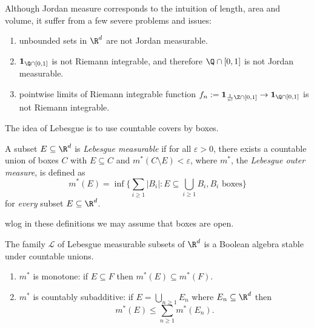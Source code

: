 \documentclass[a4paper]{article}
\begin{document}
Although Jordan measure corresponds to the intuition of length, area and volume, it suffer from a few severe problems and issues:
\begin{enumerate}
\item unbounded sets in \(\R^d\) are not Jordan measurable.
\item \(\mathbf 1_{\Q \cap [0, 1]}\) is not Riemann integrable, and therefore \(\Q \cap [0, 1]\) is not Jordan measurable.
\item pointwise limits of Riemann integrable function \(f_n := \mathbf 1_{\frac{1}{n!} \Z \cap [0, 1]} \to \mathbf 1_{\Q \cap [0, 1]}\) is not Riemann integrable.
\end{enumerate}

The idea of Lebesgue is to use countable covers by boxes.

\begin{definition}
  A subset \(E \subseteq \R^d\) is \emph{Lebesgue measurable} if for all \(\varepsilon > 0\), there exists a countable union of boxes \(C\) with \(E \subseteq C\) and \(m^*(C \setminus E) < \varepsilon\), where \(m^*\), the \emph{Lebesgue outer measure}, is defined as
  \[
    m^*(E) = \inf \{\sum_{i \geq 1} |B_i|: E \subseteq \bigcup_{i \geq 1} B_i, B_i \text{ boxes}\}
  \]
  for \emph{every} subset \(E \subseteq \R^d\).
\end{definition}

\begin{remark}
  wlog in these definitions we may assume that boxes are open.
\end{remark}


\begin{proposition}
  \label{prop:Lebesgue measurable subset is Boolean algebra}
  The family \(\mathcal L\) of Lebesgue measurable subsets of \(\R^d\) is a Boolean algebra stable under countable unions.
\end{proposition}

\begin{lemma}\leavevmode
  \begin{enumerate}
  \item \(m^*\) is monotone: if \(E \subseteq F\) then \(m^*(E) \subseteq m^*(F)\).
  \item \(m^*\) is countably subadditive: if \(E = \bigcup_{n \geq 1} E_n\) where \(E_n \subseteq \R^d\) then
    \[
      m^*(E) \leq \sum_{n \geq 1} m^*(E_n).
    \]
  \end{enumerate}
\end{lemma}
\end{document}
